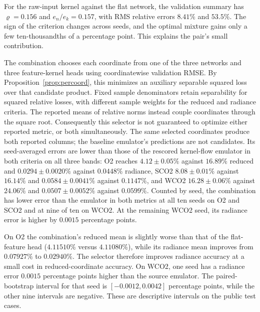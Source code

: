 For the raw-input kernel against the flat network, the validation
summary has $\varrho=0.156$ and $e_n/e_k=0.157$, with RMS relative errors
$8.41\%$ and $53.5\%$. The sign of the criterion changes across seeds,
and the optimal mixture gains only a few ten-thousandths of a
percentage point. This explains the pair's small
contribution.

The combination chooses each coordinate from one of the three networks
and three feature-kernel heads using coordinatewise validation RMSE. By
Proposition~\ref{prop:percoord}, this minimizes an auxiliary separable
squared loss over that candidate product. Fixed sample denominators retain
separability for squared relative losses, with different sample weights
for the reduced and radiance criteria. The reported means of relative
norms instead couple coordinates through the square root. Consequently
this selector is not guaranteed to optimize either reported metric, or
both simultaneously. The same selected coordinates produce both reported
columns; the baseline emulator's predictions are not candidates.
Its seed-averaged errors are lower than those of the rescored
kernel-flow emulator in both criteria on all three bands: O2 reaches
$4.12\pm0.05\%$ against $16.89\%$ reduced and $0.0294\pm0.0020\%$ against
$0.0448\%$ radiance, SCO2 $8.08\pm0.01\%$ against $16.14\%$ and
$0.0584\pm0.0041\%$ against $0.1147\%$, and WCO2 $16.28\pm0.06\%$ against
$24.06\%$ and $0.0507\pm0.0052\%$ against $0.0599\%$. Counted by seed, the
combination has lower error than the emulator in both metrics at all ten
seeds on O2 and SCO2 and at nine of ten on WCO2. At the remaining WCO2 seed,
its radiance error is higher by $0.0015$ percentage points.

On O2 the combination's reduced mean is slightly worse than that of the
flat-feature head ($4.11510\%$ versus $4.11080\%$), while its radiance mean
improves from $0.07927\%$ to $0.02940\%$. The selector therefore improves radiance accuracy at a small cost in
reduced-coordinate accuracy. On WCO2, one seed has a radiance error
$0.0015$ percentage points higher than the source emulator. The paired-bootstrap interval for that seed is
$[-0.0012,0.0042]$ percentage points, while the other nine intervals are
negative. These are descriptive intervals on the public test cases.

